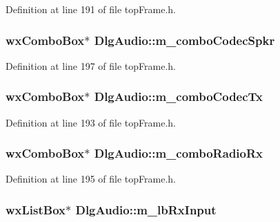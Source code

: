 Definition at line 191 of file top\-Frame.\-h.

\hypertarget{class_dlg_audio_af35d36a3df31c77480d7714e08533d58}{
\subsubsection[{m\-\_\-combo\-Codec\-Spkr}]{\setlength{\rightskip}{0pt plus 5cm}wx\-Combo\-Box$\ast$ Dlg\-Audio\-::m\-\_\-combo\-Codec\-Spkr\hspace{0.3cm}{\ttfamily [protected]}}}\label{class_dlg_audio_af35d36a3df31c77480d7714e08533d58}


Definition at line 197 of file top\-Frame.\-h.

\hypertarget{class_dlg_audio_aeaf78c48df4b0314dc4dc06bfa2244b7}{
\subsubsection[{m\-\_\-combo\-Codec\-Tx}]{\setlength{\rightskip}{0pt plus 5cm}wx\-Combo\-Box$\ast$ Dlg\-Audio\-::m\-\_\-combo\-Codec\-Tx\hspace{0.3cm}{\ttfamily [protected]}}}\label{class_dlg_audio_aeaf78c48df4b0314dc4dc06bfa2244b7}


Definition at line 193 of file top\-Frame.\-h.

\hypertarget{class_dlg_audio_aa2cf1a98f25e26545da3044b354ba9a6}{
\subsubsection[{m\-\_\-combo\-Radio\-Rx}]{\setlength{\rightskip}{0pt plus 5cm}wx\-Combo\-Box$\ast$ Dlg\-Audio\-::m\-\_\-combo\-Radio\-Rx\hspace{0.3cm}{\ttfamily [protected]}}}\label{class_dlg_audio_aa2cf1a98f25e26545da3044b354ba9a6}


Definition at line 195 of file top\-Frame.\-h.

\hypertarget{class_dlg_audio_a0690c3ab64ff5a74b476250f5f5ad490}{
\subsubsection[{m\-\_\-lb\-Rx\-Input}]{\setlength{\rightskip}{0pt plus 5cm}wx\-List\-Box$\ast$ Dlg\-Audio\-::m\-\_\-lb\-Rx\-Input\hspace{0.3cm}{\ttfamily [protected]}}}\label{class_dlg_audio_a0690c3ab64ff5a74b476250f5f5ad490}


